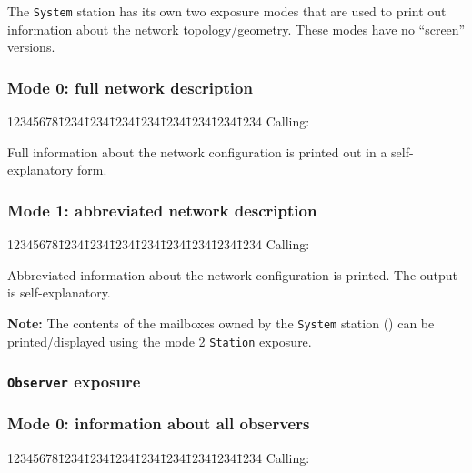 The {\tt System} station has its own two exposure modes that are used to
print out information about the network topology/geometry.
These modes have no ``screen'' versions.

\subsubsection*{Mode 0: full network description}

{\tt\begin{tabbing}
12345678\=1234\=1234\=1234\=1234\=1234\=1234\=1234\=1234\kill
{\rm Calling:}
\end{tabbing}}

Full information about the network configuration
is printed out in a self-explanatory form.

\subsubsection*{Mode 1: abbreviated network description}

{\tt\begin{tabbing}
12345678\=1234\=1234\=1234\=1234\=1234\=1234\=1234\=1234\kill
{\rm Calling:}
\end{tabbing}}

Abbreviated information about the network configuration is printed.
The output is self-explanatory.

\medskip

\noindent
{\bf Note:}
The contents of the mailboxes owned by the {\tt System} station
() can be
printed/displayed using the mode 2 {\tt Station} exposure.

\subsubsection{{\tt Observer} exposure}
\label{rm_ex_se_ob}

\subsubsection*{Mode 0: information about all observers}

{\tt\begin{tabbing}
12345678\=1234\=1234\=1234\=1234\=1234\=1234\=1234\=1234\kill
{\rm Calling:}
\end{tabbing}}

